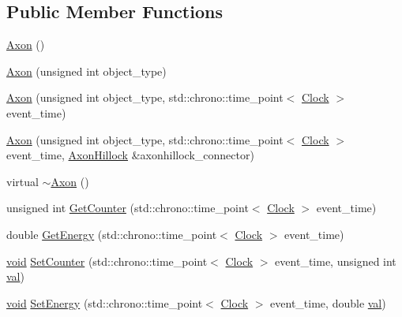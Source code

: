 \subsection*{Public Member Functions}
\begin{DoxyCompactItemize}
\item 
\mbox{\hyperlink{class_axon_a1a0703b026b74c83e418613d929c5d22}{Axon}} ()
\item 
\mbox{\hyperlink{class_axon_a7cc05238af77735983111d1ca58c9c9b}{Axon}} (unsigned int object\+\_\+type)
\item 
\mbox{\hyperlink{class_axon_a0ca4cd87ad4a2719c6b7c8c3d46dcbc6}{Axon}} (unsigned int object\+\_\+type, std\+::chrono\+::time\+\_\+point$<$ \mbox{\hyperlink{universe_8h_a0ef8d951d1ca5ab3cfaf7ab4c7a6fd80}{Clock}} $>$ event\+\_\+time)
\item 
\mbox{\hyperlink{class_axon_afaffed720efb3cb75e46088c5fb81d95}{Axon}} (unsigned int object\+\_\+type, std\+::chrono\+::time\+\_\+point$<$ \mbox{\hyperlink{universe_8h_a0ef8d951d1ca5ab3cfaf7ab4c7a6fd80}{Clock}} $>$ event\+\_\+time, \mbox{\hyperlink{class_axon_hillock}{Axon\+Hillock}} \&axonhillock\+\_\+connector)
\item 
virtual \mbox{\hyperlink{class_axon_af000507f0ff0527d1743e90d2e756282}{$\sim$\+Axon}} ()
\item 
unsigned int \mbox{\hyperlink{class_axon_a390ff1f3d85034fc85bcafc7374da9c7}{Get\+Counter}} (std\+::chrono\+::time\+\_\+point$<$ \mbox{\hyperlink{universe_8h_a0ef8d951d1ca5ab3cfaf7ab4c7a6fd80}{Clock}} $>$ event\+\_\+time)
\item 
double \mbox{\hyperlink{class_axon_a37a1ca2b0454d77dc0bc93e493feb0ce}{Get\+Energy}} (std\+::chrono\+::time\+\_\+point$<$ \mbox{\hyperlink{universe_8h_a0ef8d951d1ca5ab3cfaf7ab4c7a6fd80}{Clock}} $>$ event\+\_\+time)
\item 
\mbox{\hyperlink{glad_8h_a950fc91edb4504f62f1c577bf4727c29}{void}} \mbox{\hyperlink{class_axon_a3493cb97bde26bd66facc6084cd5f219}{Set\+Counter}} (std\+::chrono\+::time\+\_\+point$<$ \mbox{\hyperlink{universe_8h_a0ef8d951d1ca5ab3cfaf7ab4c7a6fd80}{Clock}} $>$ event\+\_\+time, unsigned int \mbox{\hyperlink{glad_8h_a26942fd2ed566ef553eae82d2c109c8f}{val}})
\item 
\mbox{\hyperlink{glad_8h_a950fc91edb4504f62f1c577bf4727c29}{void}} \mbox{\hyperlink{class_axon_af5108f451de97deb56138e8e81ced359}{Set\+Energy}} (std\+::chrono\+::time\+\_\+point$<$ \mbox{\hyperlink{universe_8h_a0ef8d951d1ca5ab3cfaf7ab4c7a6fd80}{Clock}} $>$ event\+\_\+time, double \mbox{\hyperlink{glad_8h_a26942fd2ed566ef553eae82d2c109c8f}{val}})

\end{DoxyCompactItemize}
